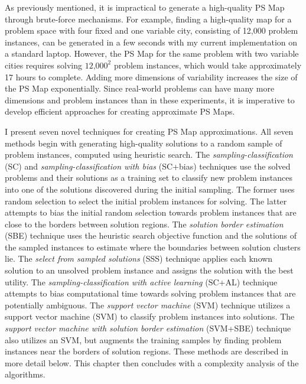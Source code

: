 As previously mentioned, it is impractical to generate a high-quality PS Map through brute-force mechanisms.  For example, finding a high-quality map for a problem space with four fixed and one variable city, consisting of 12,000 problem instances, can be generated in a few seconds with my current implementation on a standard laptop.  However, the PS Map for the same problem with two variable cities requires solving $\textrm{12,000}^{\textrm{2}}$ problem instances, which would take approximately 17 hours to complete.    Adding more dimensions of variability increases the size of the PS Map exponentially.  Since real-world problems can have many more dimensions and problem instances than in these experiments, it is imperative to develop efficient approaches for creating approximate PS Maps.



I present seven novel techniques for creating PS Map approximations.  All seven methods begin with generating high-quality solutions to a random sample of problem instances, computed using heuristic search.  The \textit{sampling-classification} (SC) and \textit{sampling-classification with bias} (SC+bias) techniques use the solved problems and their  solutions as a training set to classify new problem instances into one of the solutions discovered during the initial sampling.  The former uses random selection to select the initial problem instances for solving.  The latter attempts to bias the initial random selection towards problem instances that are close to the borders between solution regions. The \textit{solution border estimation} (SBE) technique uses the heuristic search objective function and the solutions of the sampled instances to estimate where the boundaries between solution clusters lie.  The \textit{select from sampled solutions} (SSS) technique applies each known solution to an unsolved problem instance and assigns the solution with the best utility.  The \textit{sampling-classification with active learning} (SC+AL) technique attempts to bias computational time towards solving problem instances  that are potentially ambiguous.  The \textit{support vector machine} (SVM) technique utilizes a support vector machine (SVM) to classify problem instances into solutions.  The \textit{support vector machine with solution border estimation} (SVM+SBE) technique also utilizes an SVM, but augments the training samples by finding problem instances near the borders of solution regions.  These methods are described in more detail below.  This chapter then concludes with a complexity analysis of the algorithms.

